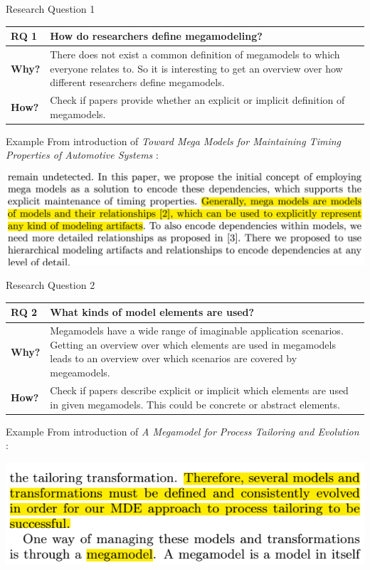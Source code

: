 \documentclass{beamer}
\begin{document}
\begin{frame}{Research Question 1}
\begin{tabular}{|l|p{9cm}|}\hline
\textbf{RQ 1} & How do researchers define megamodeling?\\\hline
\textbf{Why?} & There does not exist a common definition of me\-ga\-mo\-dels to which everyone relates to. So it is interesting to get an overview over how different researchers define megamodels.\\\hline
\textbf{How?} & Check if papers provide whether an explicit or implicit definition of megamodels.\\\hline
\end{tabular}
\end{frame}

\begin{frame}{Example}
From introduction of \textit{Toward Mega Models for Maintaining Timing Properties of Automotive Systems} \cite{Neumann_models2010}:
\begin{center}
\includegraphics[width=1.0\textwidth]{ex_rq1}
\end{center}
\end{frame}

\begin{frame}{Research Question 2}
\begin{tabular}{|l|p{9cm}|}\hline
\textbf{RQ 2} & What kinds of model elements are used?\\\hline
\textbf{Why?} & Megamodels have a wide range of imaginable application scenarios. Getting an overview over which elements are used in megamodels leads to an overview over which scenarios are covered by megeamodels.\\\hline
\textbf{How?} & Check if papers describe explicit or implicit which elements are used in given megamodels. This could be concrete or abstract elements.\\\hline
\end{tabular}
\end{frame}

\begin{frame}{Example}
From introduction of \textit{A Megamodel for Process Tailoring and Evolution} \cite{tailoring}:
\begin{center}
\includegraphics[width=1.0\textwidth]{ex_rq2}
\end{center}
\end{frame}
\end{document}
